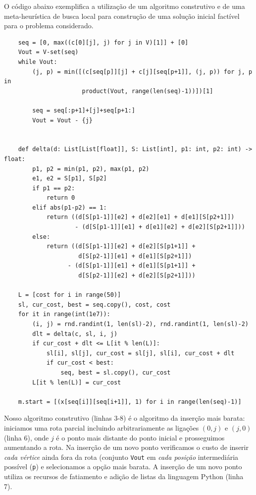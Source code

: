 \documentclass[a4paper,11pt,fleqn]{article}
\begin{document}
O código abaixo exemplifica a utilização de um algoritmo construtivo e de uma meta-heurística de busca local para construção de uma solução inicial factível para o problema considerado.
 
\begin{verbatim}
    seq = [0, max((c[0][j], j) for j in V)[1]] + [0]
    Vout = V-set(seq)
    while Vout:
        (j, p) = min([(c[seq[p]][j] + c[j][seq[p+1]], (j, p)) for j, p in
                      product(Vout, range(len(seq)-1))])[1]

        seq = seq[:p+1]+[j]+seq[p+1:]    
        Vout = Vout - {j}


    def delta(d: List[List[float]], S: List[int], p1: int, p2: int) -> float:
        p1, p2 = min(p1, p2), max(p1, p2)
        e1, e2 = S[p1], S[p2]
        if p1 == p2:
            return 0
        elif abs(p1-p2) == 1:
            return ((d[S[p1-1]][e2] + d[e2][e1] + d[e1][S[p2+1]])
                    - (d[S[p1-1]][e1] + d[e1][e2] + d[e2][S[p2+1]]))
        else:
            return ((d[S[p1-1]][e2] + d[e2][S[p1+1]] + 
                     d[S[p2-1]][e1] + d[e1][S[p2+1]])
                  - (d[S[p1-1]][e1] + d[e1][S[p1+1]] + 
                     d[S[p2-1]][e2] + d[e2][S[p2+1]]))

    L = [cost for i in range(50)]
    sl, cur_cost, best = seq.copy(), cost, cost
    for it in range(int(1e7)):
        (i, j) = rnd.randint(1, len(sl)-2), rnd.randint(1, len(sl)-2)
        dlt = delta(c, sl, i, j)
        if cur_cost + dlt <= L[it % len(L)]:
            sl[i], sl[j], cur_cost = sl[j], sl[i], cur_cost + dlt
            if cur_cost < best:
                seq, best = sl.copy(), cur_cost
        L[it % len(L)] = cur_cost
        
    m.start = [(x[seq[i]][seq[i+1]], 1) for i in range(len(seq)-1)]    
\end{verbatim}

Nosso algoritmo construtivo (linhas 3-8) é o algoritmo da inserção mais barata: iniciamos uma rota parcial incluindo arbitrariamente as ligações $(0, j)$ e $(j, 0)$ (linha 6), onde $j$ é o ponto mais distante do ponto inicial e prosseguimos aumentando a rota. Na inserção de um novo ponto verificamos o custo de inserir \emph{cada vértice} ainda fora da rota (conjunto \texttt{Vout} em \emph{cada posição} intermediária possível (\texttt{p}) e selecionamos a opção mais barata. A inserção de um novo ponto utiliza os recursos de fatiamento e adição de listas da linguagem Python (linha 7).
\end{document}
